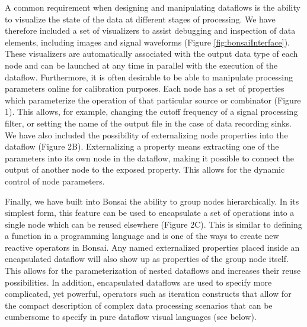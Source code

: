 A common requirement when designing and manipulating dataflows is the ability to visualize the state of the data at different stages of processing. We have therefore included a set of visualizers to assist debugging and inspection of data elements, including images and signal waveforms (Figure \ref{fig:bonsaiInterface}). These visualizers are automatically associated with the output data type of each node and can be launched at any time in parallel with the execution of the dataflow. Furthermore, it is often desirable to be able to manipulate processing parameters online for calibration purposes. Each node has a set of properties which parameterize the operation of that particular source or combinator (Figure 1). This allows, for example, changing the cutoff frequency of a signal processing filter, or setting the name of the output file in the case of data recording sinks. We have also included the possibility of externalizing node properties into the dataflow (Figure 2B). Externalizing a property means extracting one of the parameters into its own node in the dataflow, making it possible to connect the output of another node to the exposed property. This allows for the dynamic control of node parameters.

Finally, we have built into Bonsai the ability to group nodes hierarchically. In its simplest form, this feature can be used to encapsulate a set of operations into a single node which can be reused elsewhere (Figure 2C). This is similar to defining a function in a programming language and is one of the ways to create new reactive operators in Bonsai. Any named externalized properties placed inside an encapsulated dataflow will also show up as properties of the group node itself. This allows for the parameterization of nested dataflows and increases their reuse possibilities. In addition, encapsulated dataflows are used to specify more complicated, yet powerful, operators such as iteration constructs that allow for the compact description of complex data processing scenarios that can be cumbersome to specify in pure dataflow visual languages \cite{Mosconi2000} (see below).

